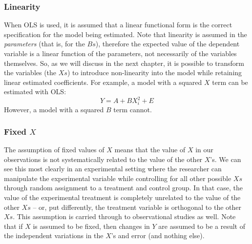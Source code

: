 \documentclass[11pt,openany]{book}\usepackage[]{graphicx}\usepackage[]{color}
\begin{document}
\begin{grbox}
\end{grbox}


\subsubsection{Linearity} 

When OLS is used, it is assumed that a linear functional form is the correct specification for the model being estimated. Note that linearity is assumed in the \textit{parameters} (that is, for the $Bs$), therefore the expected value of the dependent variable is a linear function of the
parameters, not necessarily of the variables themselves.  So, as we will discuss in the next chapter, it is possible to transform the variables 
(the $Xs$) to introduce non-linearity into the model while retaining linear estimated coefficients. For example, a model with a squared $X$ term can be estimated with OLS:
\begin{equation*}
  Y = A + BX^{2}_i + E
\end{equation*}
\noindent However, a model with a squared $B$ term cannot. 

\subsubsection{Fixed $X$} 

The assumption of fixed values of $X$ means that the value of $X$ in our observations is not systematically related to the value of the other $X$'s. We can see this most clearly in an experimental setting where the researcher  can manipulate the experimental variable while controlling for all other possible $Xs$ through random assignment to a treatment and control group. In that case, the value of the experimental treatment is completely unrelated to the value of the other $Xs$ -- or, put differently, the treatment variable is orthogonal to the other $Xs$. This assumption is carried through to observational studies as well. Note that if $X$ is assumed to be fixed, then changes in $Y$ are assumed to be a result of the independent variations in the $X$'s and error (and nothing else).    
\end{document}
